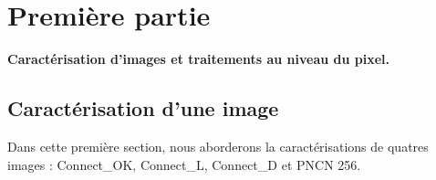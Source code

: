 \documentclass{scrreprt}
\begin{document}
\tableofcontents

\chapter{Première partie}

\begin{center}
\large{
\textbf{Caractérisation d’images et traitements au niveau du pixel.}}
\end{center}

\section{Caractérisation d'une image}

Dans cette première section, nous aborderons la caractérisations de quatres images : Connect_OK, Connect_L,
Connect_D et PNCN 256. 	
\end{document}
